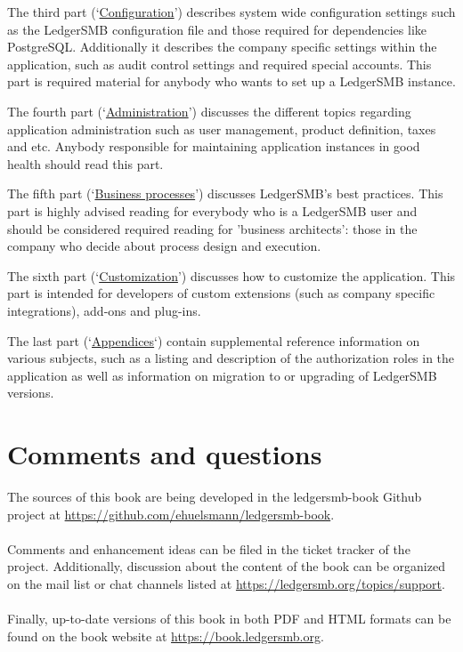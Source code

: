 The third part (\lq\hyperref[part-configuration]{Configuration}\rq) describes system wide configuration settings such as
the LedgerSMB configuration file and those required for dependencies like PostgreSQL. Additionally
it describes the company specific settings within the application, such as audit control settings
and required special accounts. This part is required material for anybody who wants to set up
a LedgerSMB instance.

The fourth part (\lq\hyperref[part-administration]{Administration}\rq) discusses the different topics
regarding application administration such as user management, product definition, taxes and etc.
Anybody responsible for maintaining application instances in good health should read this part.

The fifth part (\lq\hyperref[part-business-processes]{Business processes}\rq) discusses LedgerSMB's best practices. 
This part is highly advised
reading for everybody who is a LedgerSMB user and should be considered required reading for 'business
architects': those in the company who decide about process design and execution.

The sixth part (\lq\hyperref[part-customization]{Customization}\rq) discusses how to customize the application. 
This part is intended for developers of
custom extensions (such as company specific integrations), add-ons and plug-ins.

The last part (\lq\hyperref[part-appendices]{Appendices}\lq) contain supplemental reference information on various subjects, 
such as a listing and description
of the authorization roles in the application as well as information on migration to or upgrading of
LedgerSMB versions.


\section*{Comments and questions}
\label{sec-comments}

The sources of this book are being developed in the ledgersmb-book Github project at
\url{https://github.com/ehuelsmann/ledgersmb-book}. \\
~ \\
Comments and enhancement ideas can be filed
in the ticket tracker of the project. Additionally, discussion about the content of the book
can be organized on the mail list or chat channels listed  at \url{https://ledgersmb.org/topics/support}.\\
~ \\
Finally, up-to-date versions of this book in both PDF and HTML formats can be found on the book website at \url{https://book.ledgersmb.org}.


